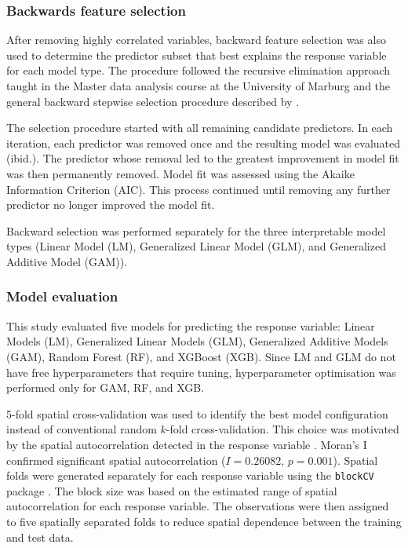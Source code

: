 \documentclass[11pt]{article}
\renewcommand{\_}{\textunderscore\allowbreak{}}
\begin{document}
\subsubsection{Backwards feature selection}\label{sec:backward_selection_methods}
After removing highly correlated variables, backward feature selection was also used to determine the predictor subset that best explains the response variable for each model type. The procedure followed the recursive elimination approach taught in the Master data analysis course at the University of Marburg \citep{zeuss2026feature} and the general backward stepwise selection procedure described by \citet{james2013islr}. 

The selection procedure started with all remaining candidate predictors. In each iteration, each predictor was removed once and the resulting model was evaluated (ibid.). The predictor whose removal led to the greatest improvement in model fit was then permanently removed. Model fit was assessed using the Akaike Information Criterion (AIC). This process continued until removing any further predictor no longer improved the model fit.

Backward selection was performed separately for the three interpretable model types (Linear Model (LM), Generalized Linear Model (GLM), and Generalized Additive Model (GAM)). 

\subsubsection{Model evaluation}\label{sec:model_evaluation}\label{sec:gam_stability}
This study evaluated five models for predicting the response variable: Linear Models (LM), Generalized Linear Models (GLM), Generalized Additive Models (GAM), Random Forest (RF), and XGBoost (XGB). Since LM and GLM do not have free hyperparameters that require tuning, hyperparameter optimisation was performed only for GAM, RF, and XGB.

5-fold spatial cross-validation was used to identify the best model configuration instead of conventional random $k$-fold cross-validation. This choice was motivated by the spatial autocorrelation detected in the response variable \citep{roberts2017crossvalidation}. Moran's I confirmed significant spatial autocorrelation ($I = 0.26082$, $p = 0.001$). Spatial folds were generated separately for each response variable using the \texttt{blockCV} package \citep{valavi2019blockcv}. The block size was based on the estimated range of spatial autocorrelation for each response variable. The observations were then assigned to five spatially separated folds to reduce spatial dependence between the training and test data.
\end{document}
